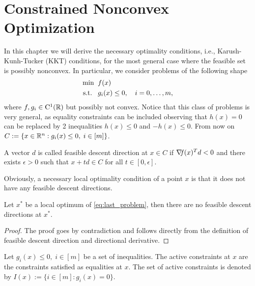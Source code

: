\documentclass[10pt,a4paper]{article}
\begin{document}
\section{Constrained Nonconvex Optimization}
In this chapter we will derive the necessary optimality conditions, i.e., Karush-Kunh-Tucker (KKT) conditions, for the most general case where the feasible set is possibly nonconvex. In particular, we consider problems of the following shape
\begin{equation}\label{eq:last_problem}
\begin{split}
\min \;\; &f(x)\\
\text{s.t.} \;\;\;& g_i(x)\leq 0, \quad i=0, \dots, m,
\end{split}
\end{equation}
where $f,g_i\in \mathord{\mathrm{C^1}}(\mathbb{R})$ but possibly not convex. Notice that this class of problems is very general, as equality constraints can be included observing that $h(x)=0$ can be replaced by 2 inequalities $h(x)\leq0$ and $-h(x)\leq 0$. From now on $C:=\{x\in\mathbb{R}^n: g_i(x)\leq 0, \; i\in [m] \}$. 
\begin{definition} A vector $d$ is called feasible descent direction at $x\in C$ if $\operatorname*{\mathit{\nabla \!f}}(x)^Td<0$ and there exists $\epsilon>0$ such that $x+td\in C$ for all $t\in [0,\epsilon].$

\end{definition}
\noindent Obviously, a necessary local optimality condition of a point $x$ is that it does not have
any feasible descent directions.
\begin{lemma} Let $x^*$ be a local optimum of \eqref{eq:last_problem}, then there are no feasible descent directions at $x^*.$
\end{lemma}
\begin{proof}
The proof goes by contradiction and follows directly from the definition of feasible descent direction and directional derivative.
\end{proof}
\begin{definition} Let $g_i(x)\leq 0, \; i\in [m] $ be a set of inequalities. The active constraints at $x$ are the constraints satisfied as equalities at $x$. The set of active constraints is denoted by $I(x):=\{i\in[m]: g_i(x)=0\}.$
\end{definition}
\end{document}
